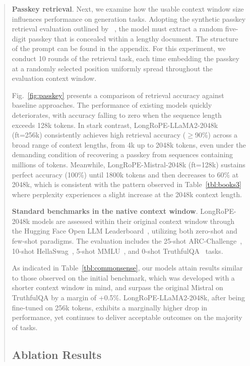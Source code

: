 \begin{abstract}
\textbf{Passkey retrieval}. Next, we examine how the usable context window size influences performance on generation tasks. Adopting the synthetic passkey retrieval evaluation outlined by ~\cite{passkey}, the model must extract a random five-digit passkey that is concealed within a lengthy document. The structure of the prompt can be found in the appendix. For this experiment, we conduct 10 rounds of the retrieval task, each time embedding the passkey at a randomly selected position uniformly spread throughout the evaluation context window.

Fig.~\ref{fig:passkey} presents a comparison of retrieval accuracy against baseline approaches. The performance of existing models quickly deteriorates, with accuracy falling to zero when the sequence length exceeds 128k tokens. In stark contrast, LongRoPE-LLaMA2-2048k (ft=256k) consistently achieves high retrieval accuracy ($\ge$90\%) across a broad range of context lengths, from 4k up to 2048k tokens, even under the demanding condition of recovering a passkey from sequences containing millions of tokens. Meanwhile, LongRoPE-Mistral-2048k (ft=128k) sustains perfect accuracy (100\%) until 1800k tokens and then decreases to 60\% at 2048k, which is consistent with the pattern observed in Table~\ref{tbl:books3} where perplexity experiences a slight increase at the 2048k context length.

\textbf{Standard benchmarks in the native context window}. LongRoPE-2048k models are assessed within their original context window through the Hugging Face Open LLM Leaderboard~\cite{huggingfaceboard}, utilizing both zero-shot and few-shot paradigms. The evaluation includes the 25-shot ARC-Challenge~\cite{allenai:arc}, 10-shot HellaSwag~\cite{zellers2019hellaswag}, 5-shot MMLU~\cite{mmlu}, and 0-shot TruthfulQA~\cite{lin2021truthfulqa} tasks.

As indicated in Table~\ref{tbl:commonsense}, our models attain results similar to those observed on the initial benchmark, which was developed with a shorter context window in mind, and surpass the original Mistral on TruthfulQA by a margin of +0.5\%. LongRoPE-LLaMA2-2048k, after being fine-tuned on 256k tokens, exhibits a marginally higher drop in performance, yet continues to deliver acceptable outcomes on the majority of tasks.

\subsection{Ablation Results}


\end{abstract}
